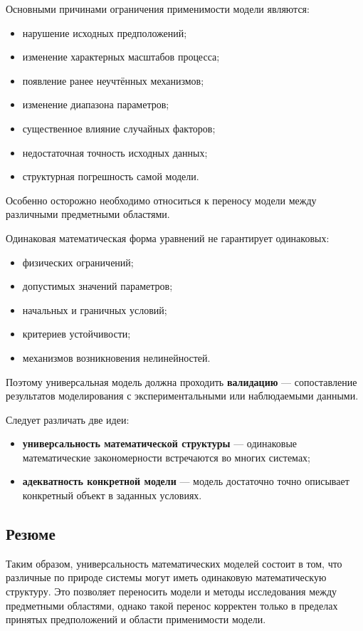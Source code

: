 Основными причинами ограничения применимости модели являются:
\begin{itemize}
	\item нарушение исходных предположений;
	\item изменение характерных масштабов процесса;
	\item появление ранее неучтённых механизмов;
	\item изменение диапазона параметров;
	\item существенное влияние случайных факторов;
	\item недостаточная точность исходных данных;
	\item структурная погрешность самой модели.
\end{itemize}

Особенно осторожно необходимо относиться к переносу модели между различными предметными областями.

Одинаковая математическая форма уравнений не гарантирует одинаковых:
\begin{itemize}
	\item физических ограничений;
	\item допустимых значений параметров;
	\item начальных и граничных условий;
	\item критериев устойчивости;
	\item механизмов возникновения нелинейностей.
\end{itemize}

Поэтому универсальная модель должна проходить \textbf{валидацию} --- сопоставление результатов моделирования с экспериментальными или наблюдаемыми данными.

Следует различать две идеи:
\begin{itemize}
	\item \textbf{универсальность математической структуры} --- одинаковые математические закономерности встречаются во многих системах;
	\item \textbf{адекватность конкретной модели} --- модель достаточно точно описывает конкретный объект в заданных условиях.
\end{itemize}

\subsection{Резюме}

Таким образом, универсальность математических моделей состоит в том, что различные по природе системы могут иметь одинаковую математическую структуру. Это позволяет переносить модели и методы исследования между предметными областями, однако такой перенос корректен только в пределах принятых предположений и области применимости модели.

\newpage